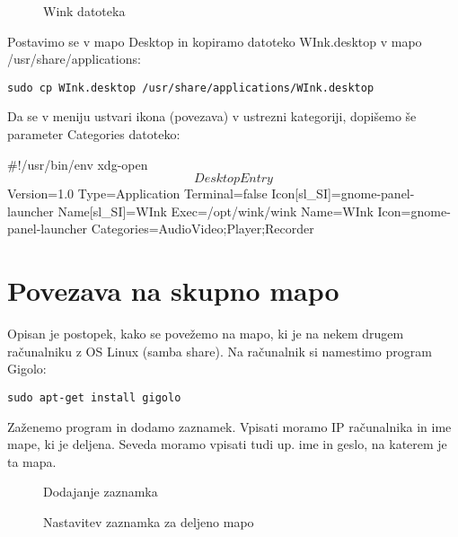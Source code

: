 \documentclass[12pt,a4paper,twoside]{article}
\begin{document}
\begin{figure}[h!] \centering
{}
\caption{Wink datoteka}\label{slika:Wink datoteka}
\end{figure}

Postavimo se v mapo Desktop in kopiramo datoteko WInk.desktop v mapo /usr/share/applications:

\texttt{sudo cp WInk.desktop /usr/share/applications/WInk.desktop}

Da se v meniju ustvari ikona (povezava) v ustrezni kategoriji, dopišemo še parameter Categories datoteko:

\#!/usr/bin/env xdg-open\linebreak 
\[Desktop Entry\]\linebreak 
Version=1.0\linebreak 
Type=Application\linebreak 
Terminal=false\linebreak 
Icon[sl\_SI]=gnome-panel-launcher\linebreak 
Name[sl\_SI]=WInk\linebreak 
Exec=/opt/wink/wink\linebreak 
Name=WInk\linebreak 
Icon=gnome-panel-launcher\linebreak 
Categories=AudioVideo;Player;Recorder\linebreak 


\section{Povezava na skupno mapo}
Opisan je postopek, kako se povežemo na mapo, ki je na nekem drugem računalniku z OS Linux (samba share). Na računalnik si namestimo program Gigolo:

\texttt{sudo apt-get install gigolo}

Zaženemo program in dodamo zaznamek. Vpisati moramo IP računalnika in ime mape, ki je deljena. Seveda moramo vpisati tudi up. ime in geslo, na katerem je ta mapa.

\begin{figure}[h!] \centering
{}
\caption{Dodajanje zaznamka}\label{slika:Dodajanje zaznamka}
\end{figure}

\begin{figure}[h!] \centering
{}
\caption{Nastavitev zaznamka za deljeno mapo}\label{slika:Nastavitev zaznamka za deljeno mapo}
\end{figure}
\end{document}
